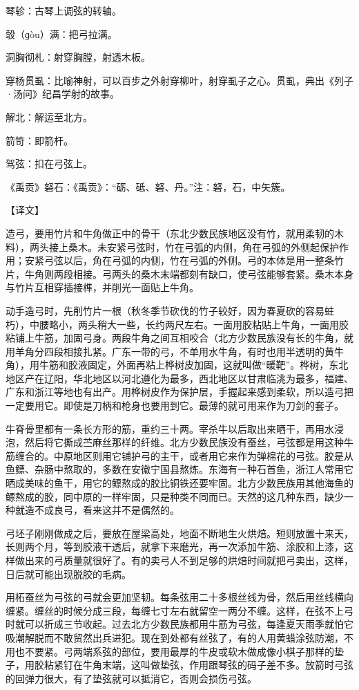 \documentclass[12pt,UTF8]{ctexbook}
\begin{document}
琴轸：古琴上调弦的转轴。

彀（ɡòu）满：把弓拉满。

洞胸彻札：射穿胸膛，射透木板。

穿杨贯虱：比喻神射，可以百步之外射穿柳叶，射穿虱子之心。贯虱，典出《列子·汤问》纪昌学射的故事。

解北：解运至北方。

箭笴：即箭杆。

驾弦：扣在弓弦上。

《禹贡》砮石：《禹贡》：“砺、砥、砮、丹。”注：砮，石，中矢簇。

【译文】

造弓，要用竹片和牛角做正中的骨干（东北少数民族地区没有竹，就用柔韧的木料），两头接上桑木。未安紧弓弦时，竹在弓弧的内侧，角在弓弧的外侧起保护作用；安紧弓弦以后，角在弓弧的内侧，竹在弓弧的外侧。弓的本体是用一整条竹片，牛角则两段相接。弓两头的桑木末端都刻有缺口，使弓弦能够套紧。桑木本身与竹片互相穿插接榫，并削光一面贴上牛角。

动手造弓时，先削竹片一根（秋冬季节砍伐的竹子较好，因为春夏砍的容易蛀朽），中腰略小，两头稍大一些，长约两尺左右。一面用胶粘贴上牛角，一面用胶粘铺上牛筋，加固弓身。两段牛角之间互相咬合（北方少数民族没有长的牛角，就用羊角分四段相接扎紧。广东一带的弓，不单用水牛角，有时也用半透明的黄牛角），用牛筋和胶液固定，外面再粘上桦树皮加固，这就叫做“暖靶”。桦树，东北地区产在辽阳，华北地区以河北遵化为最多，西北地区以甘肃临洮为最多，福建、广东和浙江等地也有出产。用桦树皮作为保护层，手握起来感到柔软，所以造弓把一定要用它。即使是刀柄和枪身也要用到它。最薄的就可用来作为刀剑的套子。

牛脊骨里都有一条长方形的筋，重约三十两。宰杀牛以后取出来晒干，再用水浸泡，然后将它撕成苎麻丝那样的纤维。北方少数民族没有蚕丝，弓弦都是用这种牛筋缠合的。中原地区则用它铺护弓的主干，或者用它来作为弹棉花的弓弦。胶是从鱼鳔、杂肠中熬取的，多数在安徽宁国县熬炼。东海有一种石首鱼，浙江人常用它晒成美味的鱼干，用它的鳔熬成的胶比铜铁还要牢固。北方少数民族用其他海鱼的鳔熬成的胶，同中原的一样牢固，只是种类不同而已。天然的这几种东西，缺少一种就造不成良弓，看来这并不是偶然的。

弓坯子刚刚做成之后，要放在屋梁高处，地面不断地生火烘焙。短则放置十来天，长则两个月，等到胶液干透后，就拿下来磨光，再一次添加牛筋、涂胶和上漆，这样做出来的弓质量就很好了。有的卖弓人不到足够的烘焙时间就把弓卖出，这样，日后就可能出现脱胶的毛病。

用柘蚕丝为弓弦的弓就会更加坚韧。每条弦用二十多根丝线为骨，然后用丝线横向缠紧。缠丝的时候分成三段，每缠七寸左右就留空一两分不缠。这样，在弦不上弓时就可以折成三节收起。过去北方少数民族都用牛筋为弓弦，每逢夏天雨季就怕它吸潮解脱而不敢贸然出兵进犯。现在到处都有丝弦了，有的人用黄蜡涂弦防潮，不用也不要紧。弓两端系弦的部位，要用最厚的牛皮或软木做成像小棋子那样的垫子，用胶粘紧钉在牛角末端，这叫做垫弦，作用跟琴弦的码子差不多。放箭时弓弦的回弹力很大，有了垫弦就可以抵消它，否则会损伤弓弦。
\end{document}
